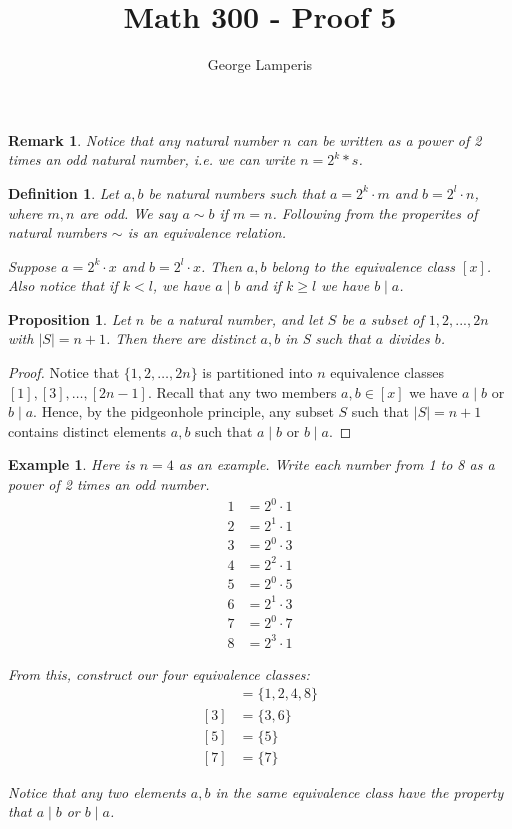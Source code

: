 \documentclass[12pt]{article}
\title{Math 300 - Proof 5}
\author{George Lamperis}
\date{}
\theoremstyle{mystyle}
\newtheorem{defn}[thm]{Definition}
\newtheorem{prop}[thm]{Proposition}
\newtheorem{remark}[thm]{Remark}
\newtheorem{example}[thm]{Example}
\begin{document}
\maketitle

\begin{remark}
  Notice that any natural number $n$ can be written as a power of 2 times an odd
  natural number, i.e. we can write $n = 2^k * s$.
\end{remark}

\begin{defn}
  Let $a,b$ be natural numbers such that $a = 2^k \cdot m$ and $b = 2^l \cdot n$,
  where $m,n$ are odd. We say $a \sim b$ if $m = n$. Following from the
  properites of natural numbers $\sim$ is an equivalence relation.
  
  Suppose $a = 2^k \cdot x$ and $b = 2^l \cdot x$. Then $a,b$ belong to the
  equivalence class $[x]$. Also notice that if $k < l$, we have $a \mid b$ and
  if $k \geq l$ we have $b \mid a$.
\end{defn}
    
\begin{prop}
  Let $n$ be a natural number, and let $S$ be a subset of ${1, 2,..., 2n}$ with
  $|S| = n + 1$. Then there are distinct $a,b$ in S such that $a$ divides $b$.
\end{prop}
\begin{proof}
  Notice that $\{1, 2, \ldots, 2n\}$ is partitioned into $n$ equivalence classes
  $[1], [3], \ldots, [2n-1]$. Recall that any two members $a,b \in [x]$
  we have $a \mid b$ or $b \mid a$. Hence, by the pidgeonhole principle, 
  any subset $S$ such that $|S| = n+1$ contains distinct elements $a,b$ such
  that $a \mid b$ or $b \mid a$.
\end{proof}

\begin{example}
  Here is $n=4$ as an example. Write each number from 1 to 8 as a power of 2
  times an odd number.
  \begin{align*}
    1 &= 2^0 \cdot 1 \\
    2 &= 2^1 \cdot 1 \\
    3 &= 2^0 \cdot 3 \\
    4 &= 2^2 \cdot 1 \\
    5 &= 2^0 \cdot 5 \\
    6 &= 2^1 \cdot 3 \\
    7 &= 2^0 \cdot 7 \\
    8 &= 2^3 \cdot 1
  \end{align*}
  
  From this, construct our four equivalence classes:
  \begin{align*}
    [1] &= \{1, 2, 4, 8\} \\
    [3] &= \{3, 6\} \\
    [5] &= \{5\} \\
    [7] &= \{7\}
  \end{align*}
  
  Notice that any two elements $a,b$ in the same equivalence class have the
  property that $a \mid b$ or $b \mid a$.
\end{example}
\end{document}
